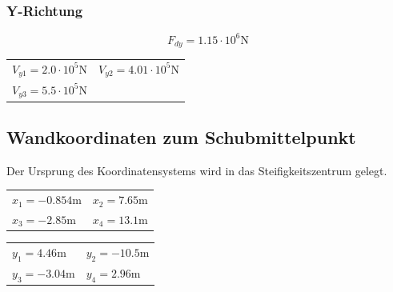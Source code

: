 \documentclass[
  letterpaper,
  DIV=11]{scrreprt}
\begin{document}
\hypertarget{y-richtung-6}{%
\subsubsection{Y-Richtung}\label{y-richtung-6}}

\begin{equation}F_{d y} = 1.15 \cdot 10^{6} \text{N}\end{equation}

\begin{longtable}[]{@{}
  >{\raggedright\arraybackslash}p{}
  >{\raggedright\arraybackslash}p{}@{}}
\toprule\noalign{}
\endhead
\bottomrule\noalign{}
\endlastfoot
\(V_{y1} = 2.0 \cdot 10^{5} \text{N}\) &
\(V_{y2} = 4.01 \cdot 10^{5} \text{N}\) \\
\(V_{y3} = 5.5 \cdot 10^{5} \text{N}\) & \\
\end{longtable}

\hypertarget{wandkoordinaten-zum-schubmittelpunkt}{%
\subsection{Wandkoordinaten zum
Schubmittelpunkt}\label{wandkoordinaten-zum-schubmittelpunkt}}

Der Ursprung des Koordinatensystems wird in das Steifigkeitszentrum
gelegt.

\begin{longtable}[]{@{}
  >{\raggedright\arraybackslash}p{}
  >{\raggedright\arraybackslash}p{}@{}}
\toprule\noalign{}
\endhead
\bottomrule\noalign{}
\endlastfoot
\(x_{1} = - 0.854 \text{m}\) & \(x_{2} = 7.65 \text{m}\) \\
\(x_{3} = - 2.85 \text{m}\) & \(x_{4} = 13.1 \text{m}\) \\
\end{longtable}

\begin{longtable}[]{@{}
  >{\raggedright\arraybackslash}p{}
  >{\raggedright\arraybackslash}p{}@{}}
\toprule\noalign{}
\endhead
\bottomrule\noalign{}
\endlastfoot
\(y_{1} = 4.46 \text{m}\) & \(y_{2} = - 10.5 \text{m}\) \\
\(y_{3} = - 3.04 \text{m}\) & \(y_{4} = 2.96 \text{m}\) \\
\end{longtable}
\end{document}
